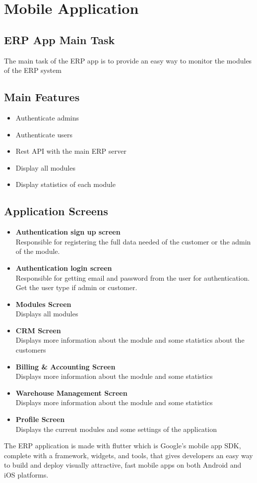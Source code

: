 \section{Mobile Application}
\subsection{ERP App Main Task}
The main task of the ERP app is to provide an easy way to monitor the modules of the ERP system
\subsection{Main Features}
\begin{itemize}
    \item Authenticate admins
    \item Authenticate users
    \item Rest API with the main ERP server
    \item Display all modules
    \item Display statistics of each module
\end{itemize}

\subsection{Application Screens}
\begin{itemize}
    \item \textbf{Authentication sign up screen}\\ Responsible for registering the full data needed of the customer or the admin of the
    module.
    \item \textbf{Authentication login screen}\\ Responsible for getting email and password from the user for authentication.
    Get the user type if admin or customer.
    \item \textbf{Modules Screen}\\ Displays all modules
    \item \textbf{CRM Screen}\\ Displays more information about the module and some statistics about the customers
    \item \textbf{Billing \& Accounting Screen}\\ Displays more information about the module and some statistics
    \item \textbf{Warehouse Management Screen}\\ Displays more information about the module and some statistics
    \item \textbf{Profile Screen}\\ Displays the current modules and some settings of the application

\end{itemize}

The ERP application is made with flutter which is Google’s mobile app SDK, complete with a
framework, widgets, and tools, that gives developers an easy way to build and deploy visually
attractive, fast mobile apps on both Android and iOS platforms.
